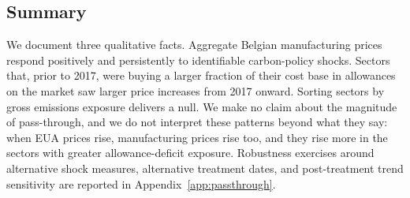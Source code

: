 \subsection{Summary}\label{sec:passthrough_summary}

We document three qualitative facts. Aggregate Belgian manufacturing prices respond positively and persistently to identifiable carbon-policy shocks. Sectors that, prior to 2017, were buying a larger fraction of their cost base in allowances on the market saw larger price increases from 2017 onward. Sorting sectors by gross emissions exposure delivers a null. We make no claim about the magnitude of pass-through, and we do not interpret these patterns beyond what they say: when EUA prices rise, manufacturing prices rise too, and they rise more in the sectors with greater allowance-deficit exposure. Robustness exercises around alternative shock measures, alternative treatment dates, and post-treatment trend sensitivity are reported in Appendix~\ref{app:passthrough}.
